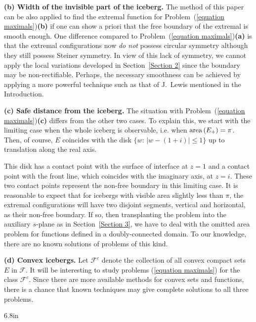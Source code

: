 \documentclass[mn,a4paper,fleqn]{w-art}
\newcommand{\Area}{{\rm area}\,}
\begin{document}
{\medskip

\textbf{(b) Width of the invisible part of the iceberg.} The
method of this paper can be also applied to find the extremal
function for Problem~(\ref{equation maximals})\textbf{(b)} if one
can show a priori that the free boundary of the extremal is smooth enough. One
difference compared to Problem~(\ref{equation
maximals})\textbf{(a)} is that the extremal configurations now
\emph{do not} possess circular symmetry although they still
possess Steiner symmetry. In view of this lack of symmetry, we cannot 
apply the local variations developed in
Section~\ref{Section 2} since the boundary may be non-rectifiable.
Perhaps, the necessary smoothness can be achieved by applying a
more powerful technique such as that of J.~Lewis \cite{L}
mentioned in the Introduction.

\medskip

\textbf{(c) Safe distance from the iceberg.} The situation with
Problem~(\ref{equation maximals})\textbf{(c)} differs from the
other two cases. To explain this, we start with the limiting case
when the whole iceberg is observable, i.e. when $\Area (E_+)=\pi$.
Then, of course, $E$ coincides with the disk $\{w:\,|w-(1+i)|\le
1\}$  up to translation along the real axis.

This disk has a contact point with the surface of interface at
$z=1$ and a contact point with the front line, which coincides
with the imaginary axis, at $z=i$. These two contact points
represent the non-free boundary in this limiting case. It is
reasonable to expect that for icebergs with visible area slightly
less than $\pi$, the extremal configurations will have two
disjoint segments, vertical and horizontal, as their non-free
boundary. If so, then transplanting the problem into the auxiliary
$s$-plane as in Section~\ref{Section 3}, we have to deal with the
omitted area problem for functions defined in a doubly-connected
domain. To our knowledge, there are no known solutions of 
problems of this kind.

\medskip

\textbf{(d) Convex icebergs.} Let ${\mathcal{F}}^c$ denote the
collection of all convex compact sets $E$ in ${\mathcal{F}}$. It
will be interesting to study problems (\ref{equation maximals})
for the class ${\mathcal{F}}^c$. Since there are more available
methods for convex sets and functions, there is a chance that
known techniques may give complete solutions to all three
problems.


\begin{thebibliography}{6.8in}


\end{thebibliography}}
\end{document}
